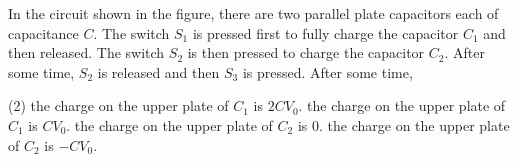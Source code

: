 
\item In the circuit shown in the figure, there are two parallel plate capacitors each of capacitance $C$. The switch $S_1$ is pressed first to fully charge the capacitor $C_1$ and then released. The switch $S_2$ is then pressed to charge the capacitor $C_2$. After some time, $S_2$ is released and then $S_3$ is pressed. After some time,
\begin{center}
\end{center}
\begin{tasks}(2)
    \task the charge on the upper plate of $C_1$ is $2CV_0$.
    \task the charge on the upper plate of $C_1$ is $CV_0$.
    \task the charge on the upper plate of $C_2$ is 0.
    \task the charge on the upper plate of $C_2$ is $-CV_0$.
\end{tasks}

